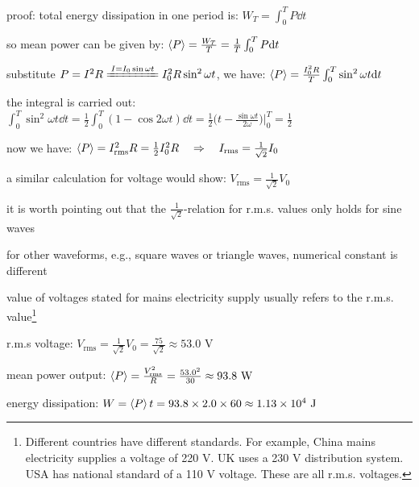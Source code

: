 \begin{compactenum}
	\item[proof:] total energy dissipation in one period is: $W_T = \int^T_0 P \dd  t$
	
	\eqyskip
	
	so mean power can be given by: $\left< P \right> = \frac{W_T}{T} = \frac{1}{T} \int^T_0 P \mathrm{d} t$
	
	\eqyskip
	
	substitute $P=I^2 R \xlongequal{I=I_0\sin\omega t} I^2_0 R \sin^2 \omega t$, we have: $\left< P \right> = \frac{I^2_0 R}{T} \int^T_0 \sin^2 \omega t \mathrm{d} t$
	
	\eqyskip
	
	the integral is carried out: $\int^T_0 \sin^2 \omega t \dd t = \frac{1}{2} \int_0^T (1-\cos2 \omega t) \dd t = \frac{1}{2} \Big(t - \frac{\sin \omega t}{2\omega} \Big) \Bigg|_0^T = \frac{1}{2}$
	
	\eqyskip
	
	now we have: $\left< P \right> = I_\text{rms}^2 R = \frac{1}{2} I_0^2 R \quad \Rightarrow \quad I_\text{rms} = \frac{1}{\sqrt{2}} I_0$
	
	a similar calculation for voltage would show: $V_\text{rms} = \frac{1}{\sqrt{2}} V_0$  
\end{compactenum}

\cmt it is worth pointing out that the $\tfrac{1}{\sqrt{2}}$-relation for r.m.s. values only holds for sine waves

for other waveforms, e.g., square waves or triangle waves, numerical constant is different

\cmt value of voltages stated for mains electricity supply usually refers to the r.m.s. value\footnote{Different countries have different standards. For example, China mains electricity supplies a voltage of 220 V. UK uses a 230 V distribution system. USA has national standard of a 110 V voltage. These are all r.m.s. voltages.}


\sol r.m.s voltage: $V_\text{rms} = \frac{1}{\sqrt{2}} V_0 = \frac{75}{\sqrt{2}} \approx 53.0 \text{ V}$

\eqyskip

mean power output: $\left< P \right> = \frac{V^2_\text{rms}}{R} = \frac{53.0^2}{30} \approx 93.8 \text{ W}$

energy dissipation: $W = \left< P \right> t = 93.8 \times 2.0 \times 60 \approx 1.13 \times 10^4 \text{ J}$ 

